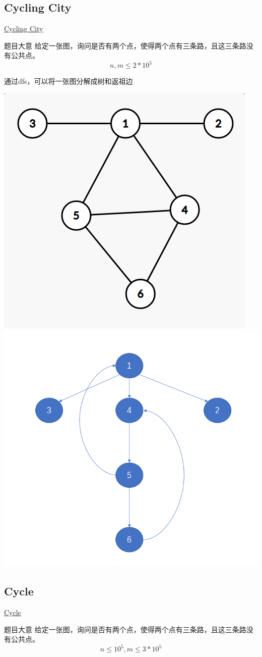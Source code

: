 \documentclass[10pt,aspectratio=43,mathserif,table]{beamer}
\begin{document}
	\subsection{Cycling City}
	\begin{frame}{\href{https://codeforces.com/problemset/problem/521/E}{Cycling City}}
		\begin{block}{题目大意}
			给定一张图，询问是否有两个点，使得两个点有三条路，且这三条路没有公共点。
			$$n,m\leq 2*10^5$$
		\end{block}
	\end{frame}
	
	\begin{frame}
		通过dfs，可以将一张图分解成树和返祖边
		
		\includegraphics[width = 0.4\linewidth]{./figure/before}		\includegraphics[width = 0.4\linewidth]{./figure/after}		
	\end{frame}
	
	\subsection{Cycle}
	\begin{frame}{\href{https://acm.hdu.edu.cn/showproblem.php?pid=5215}{Cycle}}
		\begin{block}{题目大意}
			给定一张图，询问是否有两个点，使得两个点有三条路，且这三条路没有公共点。
			$$n\leq 10^5,m\leq 3*10^5$$
		\end{block}
	\end{frame}
	
\end{document}
